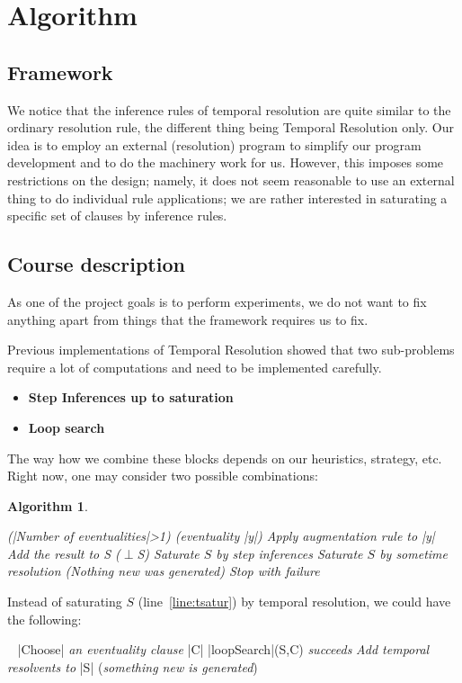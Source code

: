 \documentclass[a4paper]{article}
\makeatletter
\newcommand*{\memph}{\textbf}
\newcommand*{\statement}{\textit}
\newcommand*{\emptyclause}{\ensuremath{\perp}}
\newtheorem{algorithm}{Algorithm}[section]
\def\REPEAT{\keyword{repeat}\ \tab}
\def\UNTIL{\@marginspace\untab\tab\keyword{until}}
\def\ENDWHILE{\@marginspace\untab\keyword{end while}}
\makeatother
\begin{document}
\section{Algorithm}
\subsection{Framework}
We notice that the  inference rules of temporal resolution are quite similar to
the ordinary resolution rule, the different thing being Temporal Resolution
only.  Our idea is to employ an external (resolution) program to simplify our
program development and to do the machinery work for us. However, this imposes
some restrictions on the design; namely, it does not seem reasonable to use an
external thing to do individual rule applications; we are rather interested in
saturating a specific set of clauses by inference rules.
\subsection{Course description}
As one of the project goals is to perform experiments, we do not want 
to fix anything apart from things that the framework requires us to fix.

Previous implementations of Temporal Resolution showed that two sub-problems
require a lot of computations and need to be implemented carefully.
\begin{itemize}
\item \memph{Step Inferences up to saturation}
\item \memph{Loop search}
\end{itemize}
The way how we combine these blocks depends on our heuristics, strategy, etc.
Right now, one may consider two possible combinations:

\NumberProgramstrue 
\begin{algorithm}
\begin{program}
\BEGIN
\IF(|Number of eventualities|>1)
\THEN 
\FOREACH (\statement{eventuality} |y|) 
\DO
\statement{Apply augmentation rule to }|y|
\statement{Add the result to S}
\END
\FI
\WHILE(\emptyclause\notin S) \DO
\statement{Saturate $S$ by step inferences}
\statement{Saturate $S$ by sometime resolution} \label{line:tsatur}
\IF(\statement{Nothing new was generated})
\THEN
\statement{Stop with failure}
\FI
\ENDWHILE
\END
\end{program}
\end{algorithm}
Instead of saturating $S$ (line~\ref{line:tsatur}) by temporal resolution, we
could have the following:
\NumberProgramsfalse
\begin{program}
\REPEAT
|Choose|\statement{ an eventuality clause }|C|
\IF |loopSearch|(S,C)\statement{ succeeds}
\THEN
\statement{Add temporal resolvents to }|S|
\FI
\UNTIL (\statement{something new is generated})
\end{program}
\end{document}
